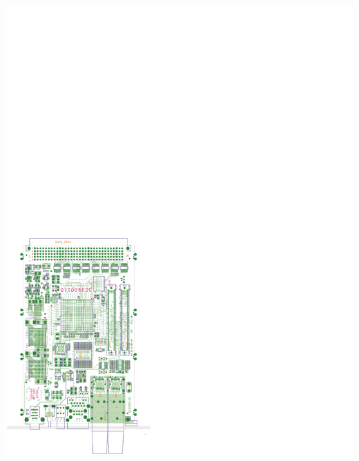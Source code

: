\documentclass[25pt,halfparskip-,pagesize]{scrartcl}
\begin{document}
\begin{multicols*}{3}
\includegraphics[angle={90}, width=\columnwidth]{../images/WEPMN018f2}


\end{multicols*}
\end{document}
